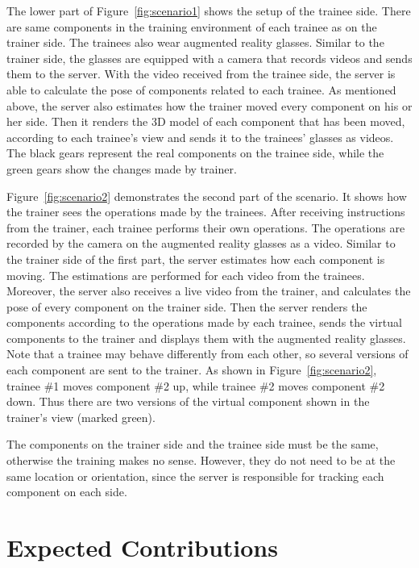 The lower part of Figure~\ref{fig:scenario1} shows the setup of the trainee side.
There are same components in the training environment of each trainee as on the trainer side.
The trainees also wear augmented reality glasses.
Similar to the trainer side, the glasses are equipped with a camera that records videos and sends them to the server. With the video received from the trainee side, the server is able to calculate the pose of components related to each trainee.
As mentioned above, the server also estimates how the trainer moved every component on his or her side. Then it renders the 3D model of each component that has been moved, according to each trainee's view and sends it to the trainees' glasses as videos.
The black gears represent the real components on the trainee side, while the green gears show the changes made by trainer.

Figure~\ref{fig:scenario2} demonstrates the second part of the scenario. It shows how the trainer sees the operations made by the trainees.
After receiving instructions from the trainer, each trainee performs their own operations. The operations are recorded by the camera on the augmented reality glasses as a video.
Similar to the trainer side of the first part, the server estimates how each component is moving. The estimations are performed for each video from the trainees.
Moreover, the server also receives a live video from the trainer, and calculates the pose of every component on the trainer side.
Then the server renders the components according to the operations made by each trainee, sends the virtual components to the trainer and displays them with the augmented reality glasses.
Note that a trainee may behave differently from each other, so several versions of each component are sent to the trainer. As shown in Figure~\ref{fig:scenario2}, trainee \#1 moves component \#2 up, while trainee \#2 moves component \#2 down. Thus there are two versions of the virtual component shown in the trainer's view (marked green).

The components on the trainer side and the trainee side must be the same, otherwise the training makes no sense. However, they do not need to be at the same location or orientation, since the server is responsible for tracking each component on each side.

\section{Expected Contributions}
\label{sec:i:ec}

